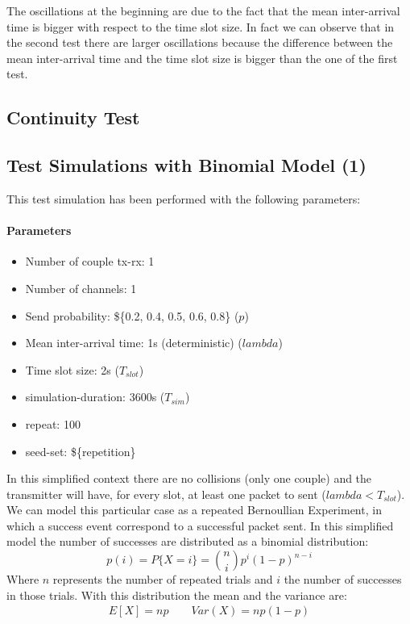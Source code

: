 \noindent The oscillations at the beginning are due to the fact that the mean inter-arrival time is bigger with respect to the time slot size. In fact we can observe that in the second test there are larger oscillations because the difference between the mean inter-arrival time and the time slot size is bigger than the one of the first test.
\subsection{Continuity Test}


\subsection{Test Simulations with Binomial Model (1)}
This test simulation has been performed with the following parameters:
\paragraph{Parameters}
\begin{itemize}
	\item Number of couple tx-rx: 1
	\item Number of channels: 1
	\item Send probability: \$\{0.2, 0.4, 0.5, 0.6, 0.8\} ($p$)
	\item Mean inter-arrival time: 1s (deterministic) ($lambda$)
	\item Time slot size: 2s ($T_{slot}$)
	\item simulation-duration: 3600s ($T_{sim}$)
	\item repeat: 100
	\item seed-set: \$\{repetition\}
\end{itemize}
In this simplified context there are no collisions (only one couple) and the transmitter will have, for every slot, at least one packet to sent ($lambda < T_{slot}$). We can model this particular case as a repeated Bernoullian Experiment, in which a success event correspond to a successful packet sent. In this simplified model the number of successes are distributed as a binomial distribution:
\begin{equation}
	p(i) = P\{X = i\} = \binom{n}{i} p^{i} (1-p)^{n-i}
\end{equation}
Where $n$ represents the number of repeated trials and $i$ the number of successes in those trials. With this distribution the mean and the variance are:
\begin{align*}
	E[X] = np \qquad     
	Var(X) = np(1-p)
\end{align*}
